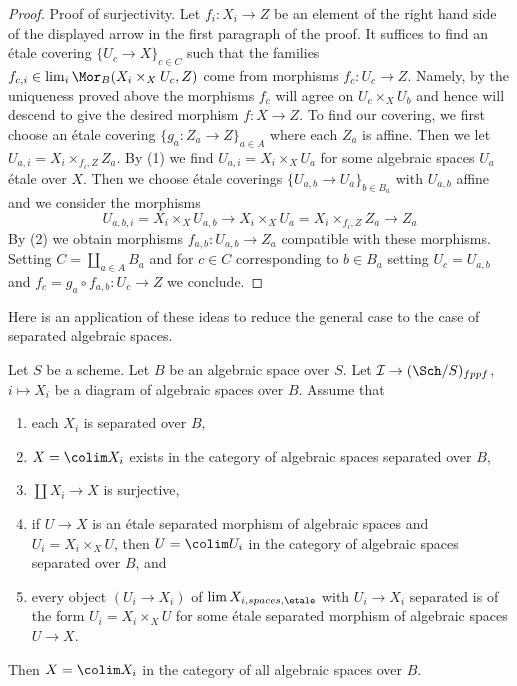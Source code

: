 \begin{proof}
\medskip\noindent
Proof of surjectivity. Let $f_i : X_i \to Z$ be an element of the
right hand side of the displayed arrow in the first paragraph of the proof.
It suffices to find an \'etale covering $\{U_c \to X\}_{c \in C}$
such that the families $f_{c, i} \in \lim_i \Mor_B(X_i \times_X U_c, Z)$
come from morphisms $f_c : U_c \to Z$. Namely, by the uniqueness
proved above the morphisms $f_c$ will agree on $U_c \times_X U_b$
and hence will descend to give the desired morphism $f : X \to Z$.
To find our covering, we first choose an \'etale covering
$\{g_a : Z_a \to Z\}_{a \in A}$ where each $Z_a$ is affine. Then we let
$U_{a, i} = X_i \times_{f_i, Z} Z_a$. By (1) we find
$U_{a, i} = X_i \times_X U_a$ for some algebraic spaces $U_a$ \'etale
over $X$. Then we choose \'etale coverings
$\{U_{a, b} \to U_a\}_{b \in B_a}$
with $U_{a, b}$ affine and we consider the morphisms
$$
U_{a, b, i} = X_i \times_X U_{a, b} \to
X_i \times_X U_a = X_i \times_{f_i, Z} Z_a \to Z_a
$$
By (2) we obtain morphisms $f_{a, b} : U_{a, b} \to Z_a$ compatible with these
morphisms. Setting $C = \coprod_{a \in A} B_a$ and for $c \in C$
corresponding to $b \in B_a$ setting $U_c = U_{a, b}$ and
$f_c = g_a \circ f_{a, b} : U_c \to Z$ we conclude.
\end{proof}

\noindent
Here is an application of these ideas to reduce the general case
to the case of separated algebraic spaces.

\begin{lemma}
\label{lemma-colimit-separated-enough}
Let $S$ be a scheme. Let $B$ be an algebraic space over $S$.
Let $\mathcal{I} \to (\Sch/S)_{fppf}$, $i \mapsto X_i$
be a diagram of algebraic spaces over $B$. Assume that
\begin{enumerate}
\item each $X_i$ is separated over $B$,
\item $X = \colim X_i$ exists in the category of
algebraic spaces separated over $B$,
\item $\coprod X_i \to X$ is surjective,
\item if $U \to X$ is an \'etale separated morphism of algebraic spaces and
$U_i = X_i \times_X U$, then $U = \colim U_i$ in
the category of algebraic spaces separated over $B$, and
\item every object $(U_i \to X_i)$ of $\lim X_{i, spaces, \etale}$
with $U_i \to X_i$ separated is of the form $U_i = X_i \times_X U$
for some \'etale separated morphism of algebraic spaces $U \to X$.
\end{enumerate}
Then $X = \colim X_i$ in the category of all algebraic spaces over $B$.
\end{lemma}

